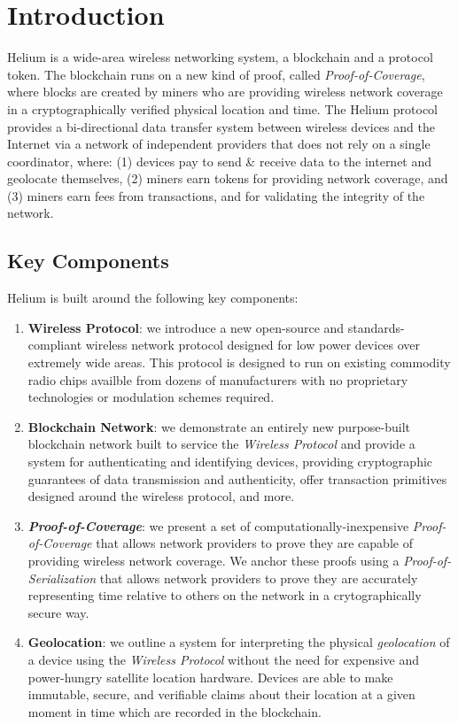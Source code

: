 \documentclass[letterpaper,11pt]{article}
\def\proofofcoverage/{\textit{Proof-of-Coverage}}
\begin{document}
\newpage

\tableofcontents
\newpage

\section{Introduction}

Helium is a wide-area wireless networking system, a blockchain and a protocol token. The blockchain runs on a new kind of proof, called \proofofcoverage/, where blocks are created by miners who are providing wireless network coverage in a cryptographically verified physical location and time. The Helium protocol provides a bi-directional data transfer system between wireless devices and the Internet via a network of independent providers that does not rely on a single coordinator, where: (1) devices pay to send \& receive data to the internet and geolocate themselves, (2) miners earn tokens for providing network coverage, and (3) miners earn fees from transactions, and for validating the integrity of the network.\newline

\subsection{Key Components}

Helium is built around the following key components:

\begin{enumerate}
	\item \textbf{Wireless Protocol}: we introduce a new open-source and standards-compliant wireless network protocol designed for low power devices over extremely wide areas. This protocol is designed to run on existing commodity radio chips availble from dozens of manufacturers with no proprietary technologies or modulation schemes required.
	\item \textbf{Blockchain Network}: we demonstrate an entirely new purpose-built blockchain network built to service the \textit{Wireless Protocol} and provide a system for authenticating and identifying devices, providing cryptographic guarantees of data transmission and authenticity, offer transaction primitives designed around the wireless protocol, and more.	
	\item \textbf{\proofofcoverage/}: we present a set of computationally-inexpensive \proofofcoverage/ that allows network providers to prove they are capable of providing wireless network coverage. We anchor these proofs using a \textit{Proof-of-Serialization} that allows network providers to prove they are accurately representing time relative to others on the network in a crytographically secure way. 	
	\item \textbf{Geolocation}: we outline a system for interpreting the physical \textit{geolocation} of a device using the \textit{Wireless Protocol} without the need for expensive and power-hungry satellite location hardware. Devices are able to make immutable, secure, and verifiable claims about their location at a given moment in time which are recorded in the blockchain.
\end{enumerate}
\end{document}

